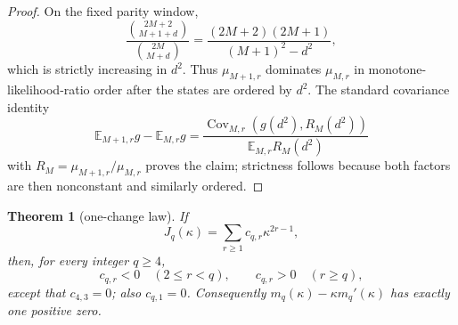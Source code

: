 \documentclass[11pt,a4paper]{article}
\newtheorem{theorem}{Theorem}[section]
\newcommand{\E}{\mathbb E}
\begin{document}
\begin{proof}
On the fixed parity window,
\[
 \frac{\binom{2M+2}{M+1+d}}{\binom{2M}{M+d}}
 =\frac{(2M+2)(2M+1)}{(M+1)^2-d^2},
\]
which is strictly increasing in $d^2$.  Thus $\mu_{M+1,r}$ dominates
$\mu_{M,r}$ in monotone-likelihood-ratio order after the states are ordered by
$d^2$.  The standard covariance identity
\[
 \E_{M+1,r}g-\E_{M,r}g
 =\frac{\operatorname{Cov}_{M,r}(g(d^2),R_M(d^2))}
 {\E_{M,r}R_M(d^2)}
\]
with $R_M=\mu_{M+1,r}/\mu_{M,r}$ proves the claim; strictness follows because
both factors are then nonconstant and similarly ordered.
\end{proof}

\begin{theorem}[one-change law]\label{thm:onechange}
If
\[
 J_q(\kappa)=\sum_{r\ge1}c_{q,r}\kappa^{2r-1},
\]
then, for every integer $q\ge4$,
\[
 c_{q,r}<0\quad(2\le r<q),\qquad
 c_{q,r}>0\quad(r\ge q),
\]
except that $c_{4,3}=0$; also $c_{q,1}=0$.  Consequently
$m_q(\kappa)-\kappa m_q'(\kappa)$ has exactly one positive zero.
\end{theorem}
\end{document}
